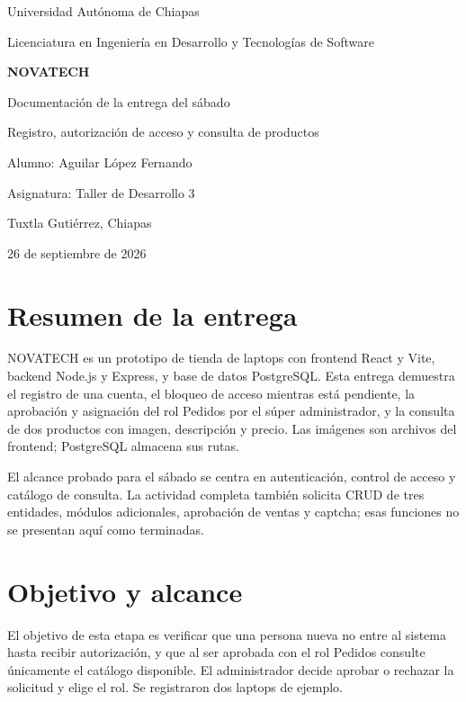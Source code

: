 \documentclass[11pt,letterpaper]{article}
\begin{document}
\begin{titlepage}
\centering
\vspace*{2.5cm}
{\Large Universidad Autónoma de Chiapas\par}
\vspace{.35cm}
{\large Licenciatura en Ingeniería en Desarrollo y Tecnologías de Software\par}
\vspace{2cm}
{\Huge\bfseries NOVATECH\par}
\vspace{.5cm}
{\LARGE Documentación de la entrega del sábado\par}
\vspace{1cm}
{\large Registro, autorización de acceso y consulta de productos\par}
\vfill
{\large Alumno: Aguilar López Fernando\par}
{\large Asignatura: Taller de Desarrollo 3\par}
{\large Tuxtla Gutiérrez, Chiapas\par}
{\large 26 de septiembre de 2026\par}
\end{titlepage}

\section*{Resumen de la entrega}
NOVATECH es un prototipo de tienda de laptops con frontend React y Vite, backend Node.js y Express, y base de datos PostgreSQL. Esta entrega demuestra el registro de una cuenta, el bloqueo de acceso mientras está pendiente, la aprobación y asignación del rol Pedidos por el súper administrador, y la consulta de dos productos con imagen, descripción y precio. Las imágenes son archivos del frontend; PostgreSQL almacena sus rutas.

El alcance probado para el sábado se centra en autenticación, control de acceso y catálogo de consulta. La actividad completa también solicita CRUD de tres entidades, módulos adicionales, aprobación de ventas y captcha; esas funciones no se presentan aquí como terminadas.

\section{Objetivo y alcance}
El objetivo de esta etapa es verificar que una persona nueva no entre al sistema hasta recibir autorización, y que al ser aprobada con el rol Pedidos consulte únicamente el catálogo disponible. El administrador decide aprobar o rechazar la solicitud y elige el rol. Se registraron dos laptops de ejemplo.
\end{document}
